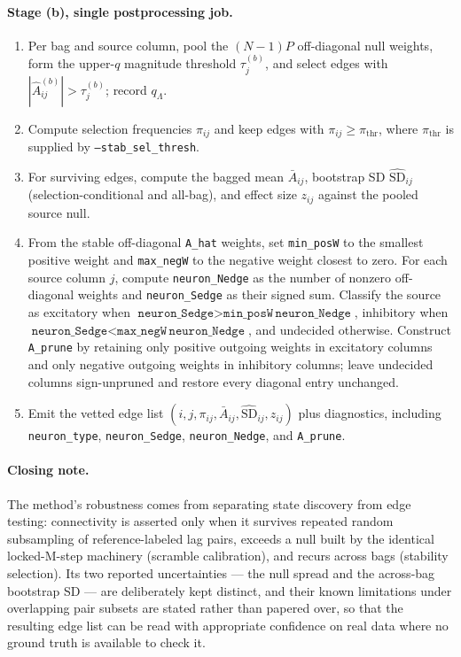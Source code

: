 \documentclass[11pt]{article}
\begin{document}
\paragraph{Stage (b), single postprocessing job.}
\begin{enumerate}
  \item Per bag and source column, pool the \((N-1)P\) off-diagonal null
  weights, form the upper-\(q\) magnitude threshold \(\tau^{(b)}_j\), and
  select edges with \(|\hat A^{(b)}_{ij}|>\tau^{(b)}_j\); record
  \(q_\Lambda\).
  \item Compute selection frequencies \(\pi_{ij}\) and keep edges with
  \(\pi_{ij}\ge\pi_{\text{thr}}\), where \(\pi_{\text{thr}}\) is supplied
  by \texttt{--stab\_sel\_thresh}.
  \item For surviving edges, compute the bagged mean \(\bar A_{ij}\),
  bootstrap SD \(\widehat{\mathrm{SD}}_{ij}\) (selection-conditional and
  all-bag), and effect size \(z_{ij}\) against the pooled source null.
  \item From the stable off-diagonal \texttt{A\_hat} weights, set
  \texttt{min\_posW} to the smallest positive weight and
  \texttt{max\_negW} to the negative weight closest to zero. For each source
  column \(j\), compute \texttt{neuron\_Nedge} as the number of nonzero
  off-diagonal weights and \texttt{neuron\_Sedge} as their signed sum.
  Classify the source as excitatory when
  \(\texttt{neuron\_Sedge}>\texttt{min\_posW}\,\texttt{neuron\_Nedge}\),
  inhibitory when
  \(\texttt{neuron\_Sedge}<\texttt{max\_negW}\,\texttt{neuron\_Nedge}\),
  and undecided otherwise. Construct \texttt{A\_prune} by retaining only
  positive outgoing weights in excitatory columns and only negative outgoing
  weights in inhibitory columns; leave undecided columns sign-unpruned and
  restore every diagonal entry unchanged.
  \item Emit the vetted edge list
  \((i,j,\pi_{ij},\bar A_{ij},\widehat{\mathrm{SD}}_{ij},z_{ij})\) plus
  diagnostics, including \texttt{neuron\_type}, \texttt{neuron\_Sedge},
  \texttt{neuron\_Nedge}, and \texttt{A\_prune}.
\end{enumerate}

\paragraph{Closing note.} The method's robustness comes from separating
state discovery from edge testing: connectivity is asserted only when it
survives repeated random subsampling of reference-labeled lag pairs,
exceeds a null built by the identical locked-M-step machinery (scramble
calibration), and recurs across bags (stability selection). Its
two reported uncertainties --- the null spread and the across-bag bootstrap
SD --- are deliberately kept distinct, and their known limitations under
overlapping pair subsets are stated rather than papered over, so that the
resulting edge list can be read with appropriate confidence on real data
where no ground truth is available to check it.
\end{document}
